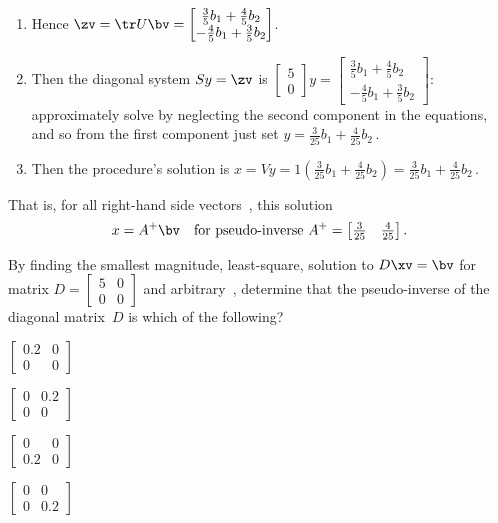 \begin{example}
\begin{solution}
\begin{enumerate}
\item Hence \(\zv=\tr U\bv=\begin{bmatrix} \tfrac35b_1+\tfrac45b_2\\-\tfrac45b_1+\tfrac35b_2 \end{bmatrix}\).
\item Then the diagonal system \(Sy=\zv\) is \(\begin{bmatrix} 5\\0 \end{bmatrix}y=\begin{bmatrix} \tfrac35b_1+\tfrac45b_2\\-\tfrac45b_1+\tfrac35b_2 \end{bmatrix}\): approximately solve by neglecting the second component in the equations, and so from the first component just set \(y=\tfrac3{25}b_1+\tfrac4{25}b_2\)\,.
\item Then the procedure's solution is \(x=Vy=1(\tfrac3{25}b_1+\tfrac4{25}b_2)=\tfrac3{25}b_1+\tfrac4{25}b_2\)\,.
\end{enumerate}
That is, for all right-hand side vectors~\bv, this  solution
\begin{equation*}
x=A^+\bv\quad\text{for pseudo-inverse }A^+=\begin{bmatrix} \tfrac3{25}& \tfrac4{25} \end{bmatrix}.
\end{equation*}
\end{solution}
\end{example}



\begin{activity}
By finding the smallest magnitude, least-square, solution to \(D\xv=\bv\) for matrix \(D=\begin{bmatrix} 5&0\\0&0 \end{bmatrix}\) and arbitrary~\bv, determine that the pseudo-inverse of the diagonal matrix~\(D\) is which of the following?
\begin{parts}
\item \(\begin{bmatrix} 0.2&0\\0&0 \end{bmatrix}\)%
\item \(\begin{bmatrix} 0&0.2\\0&0 \end{bmatrix}\)
\item \(\begin{bmatrix} 0&0\\0.2&0 \end{bmatrix}\)
\item \(\begin{bmatrix} 0&0\\0&0.2 \end{bmatrix}\)
\end{parts}
\end{activity}




